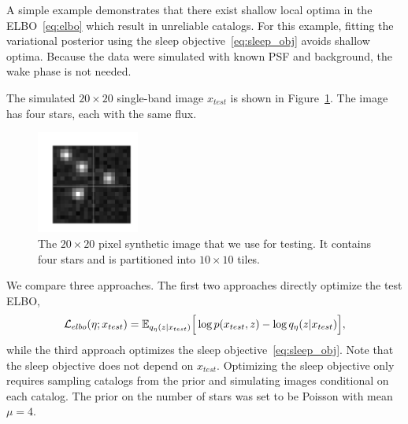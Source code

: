 

\label{sec:elbo_sleep_compare}

A simple example demonstrates that there exist shallow local optima in the ELBO~\eqref{eq:elbo} which result in unreliable catalogs. 
For this example, fitting the variational posterior using the sleep objective~\eqref{eq:sleep_obj} avoids shallow optima. 
Because the data were simulated with known PSF and background, the wake phase is not needed. 

The simulated $20\times20$ single-band image $x_{test}$ is shown in Figure~\ref{fig:toy_example}.
The image has four stars, each with the same flux. 

\begin{figure}[!h]
    \centering
    \vspace{-1em}
    \includegraphics[width = 0.3\textwidth]{figures/vi_sleep_ex_figure.png}
    \vspace{-1.7em}
    \caption{The $20\times 20$ pixel synthetic image that we use for testing. It contains four stars and is partitioned into $10\times 10$ tiles. }
    \label{fig:toy_example}
\end{figure}

We compare three approaches. The first two approaches directly optimize the test ELBO, 
\begin{align}
\mathcal{L}_{elbo}(\eta; x_{test}) = \mathbb{E}_{q_{\eta}(z | x_{test})}\Big[\log p(x_{test}, z) - \log q_{\eta}(z | x_{test})\Big],
\label{eq:elbo_on_test}
\end{align}
while the third approach optimizes the sleep objective~\eqref{eq:sleep_obj}. 
Note that the sleep objective does not depend on $x_{test}$. 
Optimizing the sleep objective only requires sampling catalogs from the prior
and simulating images conditional on each catalog. 
The prior on the number of stars was set to be Poisson with mean $\mu = 4$. 

